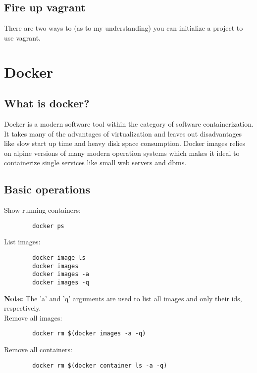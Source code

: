 \documentclass{article}
\newcommand{\note}{\textbf{Note:} }
\begin{document}
	\subsection{Fire up vagrant}
	
	There are two ways to (as to my understanding) you can initialize a project to use vagrant.
	
	\section{Docker}
	
	\subsection{What is docker?}
	Docker is a modern software tool within the category of software containerization. It takes many of the advantages of virtualization and leaves out disadvantages like slow start up time and heavy disk space consumption. Docker images relies on alpine versions of many modern operation systems which makes it ideal to containerize single services like small web servers and dbms.
	
	\subsection{Basic  operations}
	Show running containers:
	
	\begin{lstlisting}
		docker ps
	\end{lstlisting}
	
	List images:
	
	\begin{lstlisting}
		docker image ls
		docker images
		docker images -a
		docker images -q
	\end{lstlisting}

	\note{} The 'a' and 'q' arguments are used to list all images and only their ids, respectively.\\
	
	Remove all images:
	
	\begin{lstlisting}
		docker rm $(docker images -a -q)
	\end{lstlisting}

	Remove all containers:
	
	\begin{lstlisting}
		docker rm $(docker container ls -a -q)
	\end{lstlisting}
\end{document}
